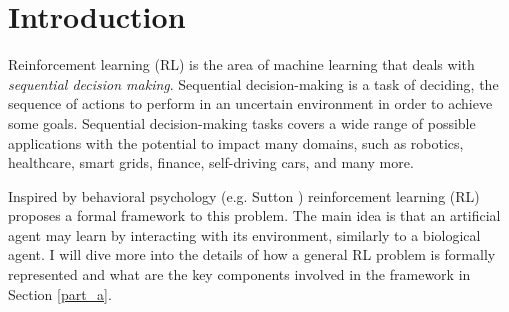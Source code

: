 \section*{Introduction}
\label{sec:intro}
Reinforcement learning (RL) is the area of machine learning that deals
with {\em sequential decision making}.
Sequential decision-making is a task of deciding, the sequence of actions
to perform in an uncertain environment in order to achieve some
goals. Sequential decision-making tasks covers a wide range of possible
applications with the potential to impact many domains, such as
robotics, healthcare, smart grids, finance, self-driving cars, and many
more.

Inspired by behavioral psychology (e.g. Sutton \cite{sutton1984temporal}) reinforcement
learning (RL) proposes a formal framework to this problem.
The main idea is that an artificial agent may learn by interacting with
its environment, similarly to a biological agent.
I will dive more into the details of how a general RL problem is formally represented and what are the key components involved in the framework in Section \ref{part_a}.






